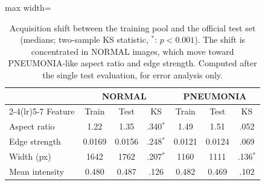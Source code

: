\begin{table}[t]
\centering
\footnotesize
\setlength{\tabcolsep}{3.5pt}
\begin{adjustbox}{max width=\columnwidth}
\begin{tabular}{lcccccc}
\toprule
 & \multicolumn{3}{c}{NORMAL} & \multicolumn{3}{c}{PNEUMONIA} \\
\cmidrule(lr){2-4}\cmidrule(lr){5-7}
Feature & Train & Test & KS & Train & Test & KS \\
\midrule
Aspect ratio & 1.22 & 1.35 & .340$^\ast$ & 1.49 & 1.51 & .052 \\
Edge strength & 0.0169 & 0.0156 & .248$^\ast$ & 0.0121 & 0.0124 & .069 \\
Width (px) & 1642 & 1762 & .207$^\ast$ & 1160 & 1111 & .136$^\ast$ \\
Mean intensity & 0.480 & 0.487 & .126 & 0.482 & 0.469 & .102 \\
\bottomrule
\end{tabular}
\end{adjustbox}
\caption{Acquisition shift between the training pool and the official test set (medians; two-sample KS statistic, $^\ast$: $p<0.001$). The shift is concentrated in NORMAL images, which move toward PNEUMONIA-like aspect ratio and edge strength. Computed after the single test evaluation, for error analysis only.}
\label{tab:shift}
\end{table}
